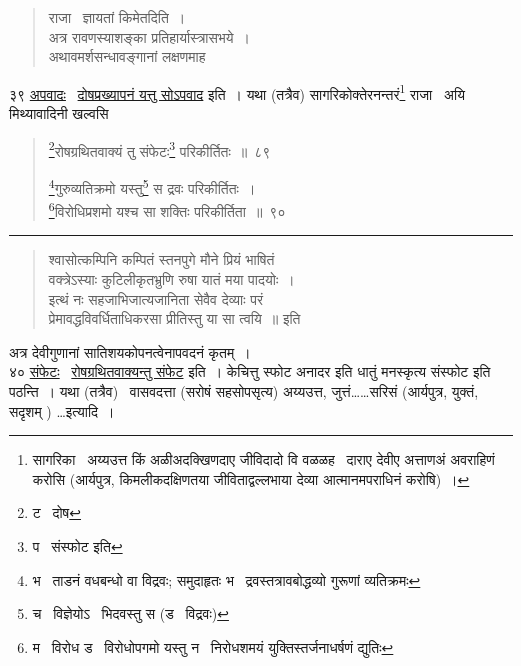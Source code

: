\documentclass[11pt, openany]{book}
\begin{document}
\begin{quote}
राजा \textendash\ ज्ञायतां किमेतदिति~।\\
अत्र रावणस्याशङ्का प्रतिहार्यास्त्रासभये~।\\
अथावमर्शसन्धावङ्गानां लक्षणमाह \textendash
\end{quote}

३९ \underline{अपवादः} \textendash\ \underline{दोषप्रख्यापनं यत्तु सोऽपवाद} इति~। यथा (तत्रैव) सागरिकोक्तेरनन्तरं\renewcommand{\thefootnote}{$\dagger$}\footnote{सागरिका \textendash\ अय्यउत्त किं अळीअदक्खिणदाए जीविदादो वि वळळह \textendash\ दाराए देवीए अत्ताणअं अवराहिणं करोसि (आर्यपुत्र, किमलीकदक्षिणतया जीविताद्वल्लभाया देव्या आत्मानमपराधिनं करोषि)~।} राजा \textendash\ अयि मिथ्यावादिनी खल्वसि \textendash

\newpage

\begin{quote}
{\na \renewcommand{\thefootnote}{1}\footnote{ट \textendash\ दोष}रोषग्रथितवाक्यं तु संफेटः\renewcommand{\thefootnote}{2}\footnote{प \textendash\ संस्फोट इति} परिकीर्तितः~॥~८९

\renewcommand{\thefootnote}{3}\footnote{भ \textendash\ ताडनं वधबन्धो वा विद्रवः; समुदाहृतः भ \textendash\ द्रवस्तत्रावबोद्धव्यो गुरूणां व्यतिक्रमः}गुरुव्यतिक्रमो यस्तु\renewcommand{\thefootnote}{4}\footnote{च \textendash\ विज्ञेयोऽ \textendash\ भिदवस्तु स (ड \textendash\ विद्रवः)} स द्रवः परिकीर्तितः~।\\
\renewcommand{\thefootnote}{5}\footnote{म \textendash\ विरोध ड \textendash\ विरोधोपगमो यस्तु न \textendash\ निरोधशमयं युक्तिस्तर्जनाधर्षणं द्युतिः}विरोधिप्रशमो यश्च सा शक्तिः परिकीर्तिता~॥~९०}
\end{quote}

\hrule

\begin{quote}
{\qt श्वासोत्कम्पिनि कम्पितं स्तनपुगे मौने प्रियं भाषितं\\
वक्त्रेऽस्याः कुटिलीकृतभ्रुणि रुषा यातं मया पादयोः~।\\
इत्थं नः सहजाभिजात्यजानिता सेवैव देव्याः परं\\
प्रेमावद्धविवर्धिताधिकरसा प्रीतिस्तु या सा त्वयि~॥} इति
\end{quote}

\noindent
अत्र देवीगुणानां सातिशयकोपनत्वेनापवदनं कृतम्~।\\

४० \underline{संफेटः} \textendash\ \underline{रोषग्रथितवाक्यन्तु संफेट} इति~। केचित्तु स्फोट अनादर इति धातुं मनस्कृत्य संस्फोट इति पठन्ति~। यथा (तत्रैव) \textendash\ वासवदत्ता (सरोषं सहसोपसृत्य) अय्यउत्त, जुत्तं\ldots\ldots सरिसं (आर्यपुत्र, युक्तं, सदृशम् ) \ldots इत्यादि~।\\
\end{document}
